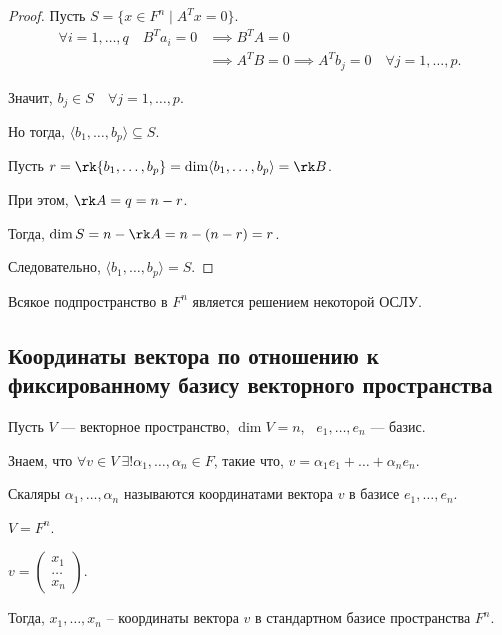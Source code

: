 \begin{proof}
    Пусть $S = \{x \in F^n \mid A^T x = 0\}$.
    \begin{align*}
        \forall i = 1, \dots, q \quad B^T a_i = 0 &\implies B^T A = 0 \\
        &\implies A^T B = 0 \implies A^T b_j = 0 \quad \forall j = 1, \dots, p
    .\end{align*}

    Значит, $b_j \in S \quad \forall j = 1, \dots, p$.

    Но тогда, $\langle b_1, \dots, b_p \rangle \subseteq S$.

    Пусть $r = \rk \{b_1, \dots, b_p\} = \dim \langle b_1, \dots, b_p \rangle = \rk B$.

    При этом, $\rk A = q = n - r$.

    Тогда, $\dim S = n - \rk A = n - (n - r) = r$.

    Следовательно, $\langle b_1, \dots, b_p \rangle = S$.
\end{proof}

\begin{corollary}
    Всякое подпространство в $F^n$ является решением некоторой ОСЛУ.
\end{corollary}


\subsection{Координаты вектора по отношению к фиксированному базису векторного пространства}

Пусть $V$ --- векторное пространство, $\dim V = n$, \ $e_1, \dots, e_n$ --- базис.

Знаем, что $\forall v \in V \ \exists! \alpha_1, \dots, \alpha_n \in F$, такие что, $v = \alpha_1 e_1 + \dots + \alpha_n e_n$.

\begin{definition}
    Скаляры $\alpha_1, \dots, \alpha_n$ называются координатами вектора $v$ в базисе $e_1, \dots, e_n$.
\end{definition}

\begin{example}
    $V = F^n$.

    $v = \begin{pmatrix} x_1 \\ \dots \\ x_n \end{pmatrix}$.

    Тогда, $x_1, \dots, x_n$ -- координаты вектора $v$ в стандартном базисе пространства $F^n$.
\end{example}


